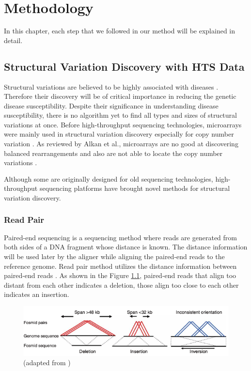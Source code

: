 \chapter{Methodology}
In this chapter, each step that we followed in our method will be explained in detail.
\section{Structural Variation Discovery with HTS Data}
Structural variations are believed to be highly associated with diseases \cite{fanciulli2007fcgr3b,fellermann2006chromosome,aitman2006copy,gonzalez2005influence}. Therefore their discovery will be of critical importance in reducing the genetic disease susceptibility. Despite their significance in understanding disease susceptibility, there is no algorithm yet to find all types and sizes of structural variations at once. Before high-throughput sequencing technologies, microarrays were mainly used in structural variation discovery especially for copy number variation \cite{alkan2011genome}. As reviewed by Alkan et al., microarrays are no good at discovering balanced rearrangements and also are not able to locate the copy number variations \cite{alkan2011genome}. 

Although some are originally designed for old sequencing technologies, high-throughput sequencing platforms have brought novel methods for structural variation discovery. 
\subsection{Read Pair}
Paired-end sequencing is a sequencing method where reads are generated from both sides of a DNA fragment whose distance is known. The distance information will be used later by the aligner while aligning the paired-end reads to the reference genome. Read pair method utilizes the distance information between paired-end reads \cite{tuzun2005fine}. As shown in the Figure \ref{readpair}, paired-end reads that align too distant from each other indicates a deletion, those align too close to each other indicates an insertion.

\begin{figure}[ht]
    \centering
    \includegraphics[scale=0.4]{images/readpair.png}
    \caption{(adapted from \cite{tuzun2005fine})}
    \label{readpair}
\end{figure}

